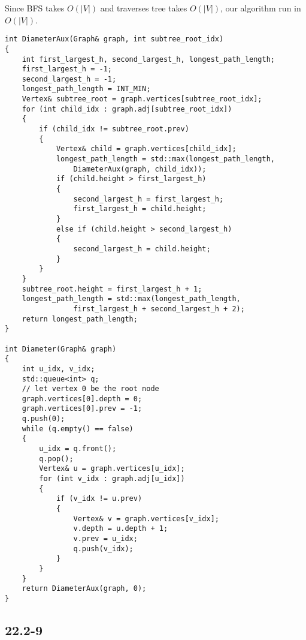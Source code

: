 Since BFS takes $O(|V|)$ and traverses tree takes $O(|V|)$,
our algorithm run in $O(|V|)$.

\begin{verbatim}
int DiameterAux(Graph& graph, int subtree_root_idx)
{
    int first_largest_h, second_largest_h, longest_path_length;
    first_largest_h = -1;
    second_largest_h = -1;
    longest_path_length = INT_MIN;
    Vertex& subtree_root = graph.vertices[subtree_root_idx];
    for (int child_idx : graph.adj[subtree_root_idx])
    {
        if (child_idx != subtree_root.prev)
        {
            Vertex& child = graph.vertices[child_idx];
            longest_path_length = std::max(longest_path_length, 
                DiameterAux(graph, child_idx));
            if (child.height > first_largest_h)
            {
                second_largest_h = first_largest_h;
                first_largest_h = child.height;
            }
            else if (child.height > second_largest_h)
            {
                second_largest_h = child.height;
            }
        }
    }
    subtree_root.height = first_largest_h + 1;
    longest_path_length = std::max(longest_path_length, 
                first_largest_h + second_largest_h + 2);
    return longest_path_length;
}

int Diameter(Graph& graph)
{
    int u_idx, v_idx;
    std::queue<int> q;
    // let vertex 0 be the root node
    graph.vertices[0].depth = 0;
    graph.vertices[0].prev = -1;
    q.push(0);
    while (q.empty() == false)
    {
        u_idx = q.front();
        q.pop();
        Vertex& u = graph.vertices[u_idx];
        for (int v_idx : graph.adj[u_idx])
        {
            if (v_idx != u.prev)
            {
                Vertex& v = graph.vertices[v_idx];
                v.depth = u.depth + 1;
                v.prev = u_idx;
                q.push(v_idx);
            }
        }
    }
    return DiameterAux(graph, 0);
}
\end{verbatim}

\subsection*{22.2-9}

